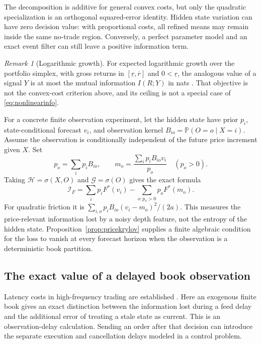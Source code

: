 \documentclass[11pt]{article}
\theoremstyle{plain}
\theoremstyle{definition}
\theoremstyle{remark}
\newtheorem{remark}[theorem]{Remark}
\begin{document}
The decomposition is additive for general convex costs, but only
the quadratic specialization is an orthogonal squared-error
identity. Hidden state variation can have zero decision value:
with proportional costs, all refined means may remain inside the
same no-trade region. Conversely, a perfect parameter model and
an exact event filter can still leave a positive information term.

\begin{remark}[Logarithmic growth]\label{rem:kelly}
For expected logarithmic growth over the portfolio simplex, with gross returns
in $[\underline r,\overline r]$ and $0<\underline r$, the analogous value of a
signal $Y$ is at most the mutual information $I(R;Y)$ in nats
\citep{Kelly1956,CoverThomas2006}. That objective is not the convex-cost criterion above, and
its ceiling is not a special case of \eqref{eq:nonlinearinfo}.
\end{remark}


For a concrete finite observation experiment, let the hidden state
have prior \(p_i\), state-conditional forecast \(v_i\), and
observation kernel \(B_{io}=\mathbb P(O=o\mid X=i)\). Assume
the observation is conditionally independent of the future price
increment given \(X\). Set
\[
 p_o=\sum_i p_iB_{io},\qquad
 m_o=\frac{\sum_i p_iB_{io}v_i}{p_o}\quad(p_o>0).
\]
Taking \(\mathcal H=\sigma(X,O)\) and \(\mathcal G=\sigma(O)\)
gives the exact formula
\begin{equation}\label{eq:finiteobservationvalue}
 \mathcal I_F
 =\sum_i p_iF^*(v_i)-\sum_{o:p_o>0}p_oF^*(m_o).
\end{equation}
For quadratic friction it is
\(\sum_{i,o}p_iB_{io}(v_i-m_o)^2/(2a)\).
This measures the price-relevant information lost by a noisy
depth feature, not the entropy of the hidden state.
Proposition~\ref{prop:pricekrylov} supplies a finite algebraic
condition for the loss to vanish at every forecast horizon
when the observation is a deterministic book partition.


\subsection{The exact value of a delayed book observation}
\label{sec:feedlatency}

Latency costs in high-frequency trading are established
\citep{MoallemiSaglam2013}. Here an exogenous finite book gives an
exact distinction between the information lost during a feed delay
and the additional error of treating a stale state as current.
This is an observation-delay calculation. Sending an order after
that decision can introduce the separate execution and cancellation
delays modeled in a control problem.
\end{document}
